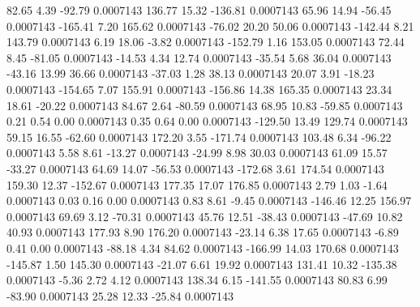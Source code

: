        82.65        4.39      -92.79     0.0007143
      136.77       15.32     -136.81     0.0007143
       65.96       14.94      -56.45     0.0007143
     -165.41        7.20      165.62     0.0007143
      -76.02       20.20       50.06     0.0007143
     -142.44        8.21      143.79     0.0007143
        6.19       18.06       -3.82     0.0007143
     -152.79        1.16      153.05     0.0007143
       72.44        8.45      -81.05     0.0007143
      -14.53        4.34       12.74     0.0007143
      -35.54        5.68       36.04     0.0007143
      -43.16       13.99       36.66     0.0007143
      -37.03        1.28       38.13     0.0007143
       20.07        3.91      -18.23     0.0007143
     -154.65        7.07      155.91     0.0007143
     -156.86       14.38      165.35     0.0007143
       23.34       18.61      -20.22     0.0007143
       84.67        2.64      -80.59     0.0007143
       68.95       10.83      -59.85     0.0007143
        0.21        0.54        0.00     0.0007143
        0.35        0.64        0.00     0.0007143
     -129.50       13.49      129.74     0.0007143
       59.15       16.55      -62.60     0.0007143
      172.20        3.55     -171.74     0.0007143
      103.48        6.34      -96.22     0.0007143
        5.58        8.61      -13.27     0.0007143
      -24.99        8.98       30.03     0.0007143
       61.09       15.57      -33.27     0.0007143
       64.69       14.07      -56.53     0.0007143
     -172.68        3.61      174.54     0.0007143
      159.30       12.37     -152.67     0.0007143
      177.35       17.07      176.85     0.0007143
        2.79        1.03       -1.64     0.0007143
        0.03        0.16        0.00     0.0007143
        0.83        8.61       -9.45     0.0007143
     -146.46       12.25      156.97     0.0007143
       69.69        3.12      -70.31     0.0007143
       45.76       12.51      -38.43     0.0007143
      -47.69       10.82       40.93     0.0007143
      177.93        8.90      176.20     0.0007143
      -23.14        6.38       17.65     0.0007143
       -6.89        0.41        0.00     0.0007143
      -88.18        4.34       84.62     0.0007143
     -166.99       14.03      170.68     0.0007143
     -145.87        1.50      145.30     0.0007143
      -21.07        6.61       19.92     0.0007143
      131.41       10.32     -135.38     0.0007143
       -5.36        2.72        4.12     0.0007143
      138.34        6.15     -141.55     0.0007143
       80.83        6.99      -83.90     0.0007143
       25.28       12.33      -25.84     0.0007143
